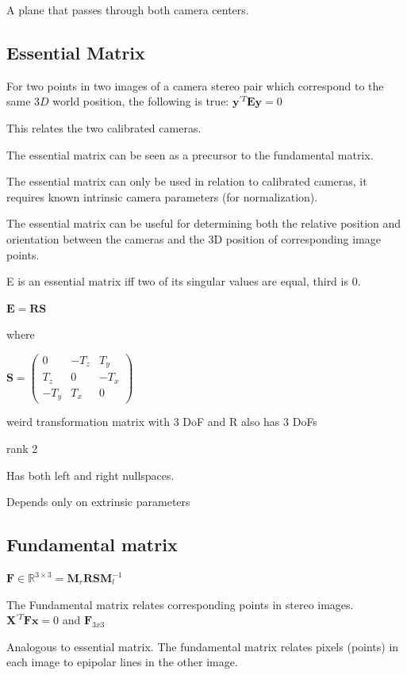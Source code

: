 \begin{enumerate}
A plane that passes through both camera centers.

\subsection{Essential Matrix}

For two points in two images of a camera stereo pair which correspond to the same $3D$ world position, the following is true: 
$\mathbf{y}^{\prime T}\mathbf{Ey}=0$

This relates the two calibrated cameras.

The essential matrix can be seen as a precursor to the fundamental matrix. 

The essential matrix can only be used in relation to calibrated cameras, it requires known intrinsic camera parameters (for normalization).

The essential matrix can be useful for determining both the relative position and orientation between the cameras and the 3D position of corresponding image points.

 E is an essential matrix iff two of its singular values are equal, third is 0.

$\mathbf{E}=\mathbf{RS}$

where 

$\mathbf{S} = \left( \begin{matrix} 0 & -T_z & T_y \\ T_z & 0 & -T_x \\ -T_y & T_x & 0  \end{matrix} \right)$

weird transformation matrix with 3 DoF and R also has 3 DoFs

rank 2 

Has both left and right nullspaces.

Depends only on extrinsic parameters

\subsection{ Fundamental matrix}

$\mathbf F \in \mathbb{R}^{3\times3} = \mathbf{M}_r\mathbf{RSM}_l^{-1}$ 

The Fundamental matrix relates corresponding points in stereo images.
$\mathbf{X}^{\prime T}\mathbf{Fx}=0$ and $\mathbf{F}_{3x3}$

Analogous to essential matrix. The fundamental matrix relates pixels (points) in each image to epipolar lines in the other image.


\end{enumerate}
